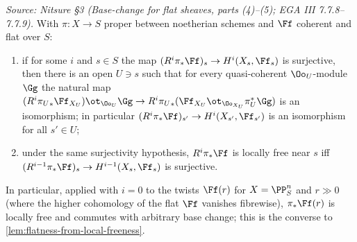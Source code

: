 \begin{theorem}
  \label{thm:base-change-flat}
  \textit{Source: Nitsure §3 (Base-change for flat sheaves, parts (4)--(5); EGA III 7.7.8--7.7.9).}
  With $\pi\colon X\to S$ proper between noetherian schemes and $\Ff$ coherent
  and flat over $S$:
  \begin{enumerate}
    \item[(4)] if for some $i$ and $s\in S$ the map
      $(R^i\pi_*\Ff)_s\to H^i(X_s,\Ff_s)$ is surjective, then there is an open
      $U\ni s$ such that for every quasi-coherent $\Oo_U$-module $\Gg$ the
      natural map
      $(R^i{\pi_U}_*\Ff_{X_U})\ot_{\Oo_U}\Gg\to
       R^i{\pi_U}_*(\Ff_{X_U}\ot_{\Oo_{X_U}}\pi_U^*\Gg)$
      is an isomorphism; in particular $(R^i\pi_*\Ff)_{s'}\to H^i(X_{s'},\Ff_{s'})$
      is an isomorphism for all $s'\in U$;
    \item[(5)] under the same surjectivity hypothesis, $R^i\pi_*\Ff$ is locally
      free near $s$ iff $(R^{i-1}\pi_*\Ff)_s\to H^{i-1}(X_s,\Ff_s)$ is surjective.
  \end{enumerate}
  In particular, applied with $i=0$ to the twists $\Ff(r)$ for $X=\PP^n_S$ and
  $r\gg 0$ (where the higher cohomology of the flat $\Ff$ vanishes fibrewise),
  $\pi_*\Ff(r)$ is locally free and commutes with arbitrary base change; this is
  the converse to \cref{lem:flatness-from-local-freeness}.
\end{theorem}


